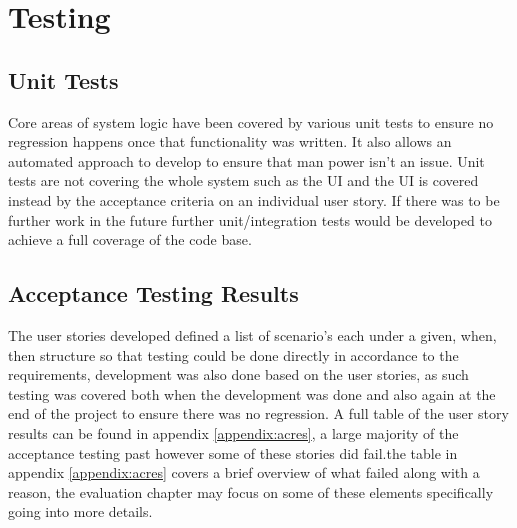 \section{Testing}
\subsection{Unit Tests}
Core areas of system logic have been covered by various unit tests to ensure no regression happens once that functionality was written. It also allows an automated approach to develop to ensure that man power isn't an issue. Unit tests are not covering the whole system such as the UI and the UI is covered instead by the acceptance criteria on an individual user story. If there was to be further work in the future further unit/integration tests would be developed to achieve a full coverage of the code base.

\subsection{Acceptance Testing Results}
The user stories developed defined a list of scenario's each under a given, when, then structure so that testing could be done directly in accordance to the requirements, development was also done based on the user stories, as such testing was covered both when the development was done and also again at the end of the project to ensure there was no regression. A full table of the user story results can be found in appendix \ref{appendix:acres}, a large majority of the acceptance testing past however some of these stories did fail.the table in appendix \ref{appendix:acres} covers a brief overview of what failed along with a reason, the evaluation chapter may focus on some of these elements specifically going into more details.